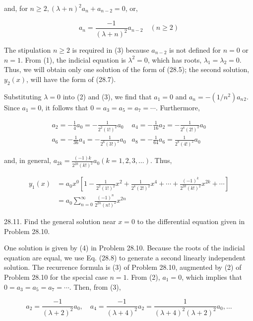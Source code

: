 \documentclass[10pt]{article}
\begin{document}
and, for $n \geq 2,(\lambda+n)^{2} a_{n}+a_{n-2}=0$, or,


\begin{equation*}
a_{n}=\frac{-1}{(\lambda+n)^{2}} a_{n-2} \quad(n \geq 2) \tag{3}
\end{equation*}


The stipulation $n \geq 2$ is required in (3) because $a_{n-2}$ is not defined for $n=0$ or $n=1$. From (1), the indicial equation is $\lambda^{2}=0$, which has roots, $\lambda_{1}=\lambda_{2}=0$. Thus, we will obtain only one solution of the form of (28.5); the second solution, $y_{2}(x)$, will have the form of (28.7).

Substituting $\lambda=0$ into (2) and (3), we find that $a_{1}=0$ and $a_{n}=-\left(1 / n^{2}\right) a_{n}{ }_{2}$. Since $a_{1}=0$, it follows that $0=a_{3}=a_{5}=a_{7}=\cdots$. Furthermore,

$$
\begin{array}{ll}
a_{2}=-\frac{1}{4} a_{0}=-\frac{1}{2^{2}(1 !)^{2}} a_{0} & a_{4}=-\frac{1}{16} a_{2}=-\frac{1}{2^{4}(2 !)^{2}} a_{0} \\
a_{6}=-\frac{1}{36} a_{4}=-\frac{1}{2^{6}(3 !)^{2}} a_{0} & a_{8}=-\frac{1}{64} a_{6}=\frac{1}{2^{8}(4 !)^{2}} a_{0}
\end{array}
$$

and, in general, $a_{2 k}=\frac{(-1) k}{2^{2 k}(k !)^{2}} a_{0}(k=1,2,3, \ldots)$. Thus,


\begin{align*}
y_{1}(x) & =a_{0} x^{0}\left[1-\frac{1}{2^{2}(1 !)^{2}} x^{2}+\frac{1}{2^{4}(2 !)^{2}} x^{4}+\cdots+\frac{(-1)^{k}}{2^{2 k}(k !)^{2}} x^{2 k}+\cdots\right] \\
& =a_{0} \sum_{n=0}^{\infty} \frac{(-1)^{n}}{2^{2 n}(n !)^{2}} x^{2 n} \tag{4}
\end{align*}


28.11. Find the general solution near $x=0$ to the differential equation given in Problem 28.10.

One solution is given by (4) in Problem 28.10. Because the roots of the indicial equation are equal, we use Eq. (28.8) to generate a second linearly independent solution. The recurrence formula is (3) of Problem 28.10, augmented by (2) of Problem 28.10 for the special case $n=1$. From (2), $a_{1}=0$, which implies that $0=a_{3}=a_{5}=a_{7}=\cdots$. Then, from (3),

$$
a_{2}=\frac{-1}{(\lambda+2)^{2}} a_{0}, \quad a_{4}=\frac{-1}{(\lambda+4)^{2}} a_{2}=\frac{1}{(\lambda+4)^{2}(\lambda+2)^{2}} a_{0}, \ldots
$$
\end{document}
